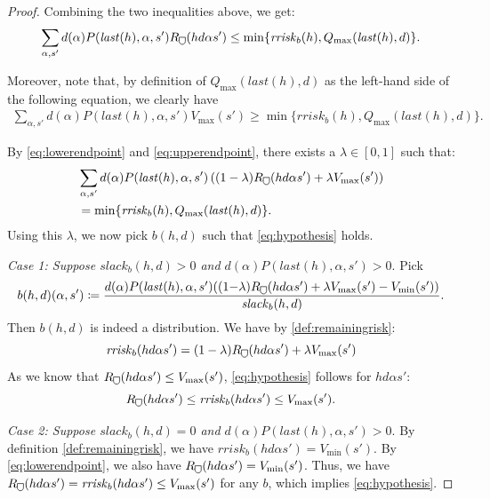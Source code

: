 \documentclass[runningheads]{llncs}
\newcommand\shieldbase{%
  \tikz[baseline=0.2ex] \draw[semithick]
    (0,1.75ex) -- (0,0.75ex)
    arc [radius=0.75ex, start angle=-180, end angle=0]
    -- (1.5ex,1.75ex) -- cycle;%
}
\DeclareRobustCommand\shield{%
  \mathord{\scalerel*{\shieldbase}{\bigcirc}}%
}
\newcommand{\slack}{\mathit{slack}}
\newcommand{\rrisk}{\mathit{rrisk}}
\newcommand{\last}{\mathit{last}}
\begin{document}
\begin{proof}
    Combining the two inequalities above, we get:
    \begin{align}
        \sum_{\alpha, s'} d(\alpha) P(\last(h), \alpha, s') R_{\shield}(h d \alpha s') \leq \min \{ \rrisk_b(h), Q_{\max}(\last(h), d)\}. \label{eq:lowerendpoint}
    \end{align}

    Moreover, note that, by definition of \(Q_{\max}(\last(h), d)\) as the left-hand side of the following equation, we clearly have
    \begin{align}
        \sum_{\alpha, s'} d(\alpha) P(\last(h), \alpha, s') V_{\max}(s') \geq \min \{ \rrisk_b(h), Q_{\max}(\last(h), d)\}.  \label{eq:upperendpoint}
    \end{align}

    By \cref{eq:lowerendpoint} and \cref{eq:upperendpoint}, there exists a \(\lambda \in [0,1]\) such that:
    \begin{align*}
        &\sum_{\alpha,s'} d(\alpha) P(\last(h), \alpha, s') \left(  (1-\lambda) R_{\shield}(h d \alpha s') + \lambda V_{\max}(s') \right) \\
        &= \min \{ \rrisk_b(h), Q_{\max}(\last(h), d) \}.
    \end{align*}
    Using this  \(\lambda\), we now pick \(b(h,d)\) such that \cref{eq:hypothesis} holds.

    \emph{Case 1: Suppose \(\slack_b(h,d) > 0\) and \(d(\alpha) P(\last(h), \alpha, s') > 0\)}.
    Pick \[
        b(h,d)(\alpha,s') \coloneq \frac{d(\alpha) P(\last(h), \alpha, s')((1{-}\lambda) R_{\shield}(h d \alpha s') + \lambda V_{\max}(s') - V_{\min}(s'))}{\slack_b(h,d)}.
    \]
    Then \(b(h,d)\) is indeed a distribution. We have by \cref{def:remainingrisk}: \[
        \rrisk_b(h d \alpha s') = (1 - \lambda) R_{\shield}(h d \alpha s') + \lambda V_{\max}(s')
    \]
    As we know that \(R_{\shield}(h d \alpha s') \leq V_{\max}(s')\), \cref{eq:hypothesis} follows for \(h d \alpha s'\): \[
        R_{\shield}(h d \alpha s') \leq \rrisk_b(h d \alpha s') \leq V_{\max}(s').
    \]
    
    
    \emph{Case 2: Suppose \(\slack_b(h,d) = 0\) and \(d(\alpha) P(\last(h), \alpha, s') > 0\)}.
    By definition \cref{def:remainingrisk}, we have \(\rrisk_b(h d \alpha s') = V_{\min}(s')\).
    By \cref{eq:lowerendpoint}, we also have \(R_{\shield}(h d \alpha s') = V_{\min}(s')\).
    Thus, we have \(
        R_{\shield}(h d \alpha s') = \rrisk_b(h d \alpha s') \leq V_{\max}(s')
    \)
    for any \(b\), which implies \cref{eq:hypothesis}.


\end{proof}
\end{document}
